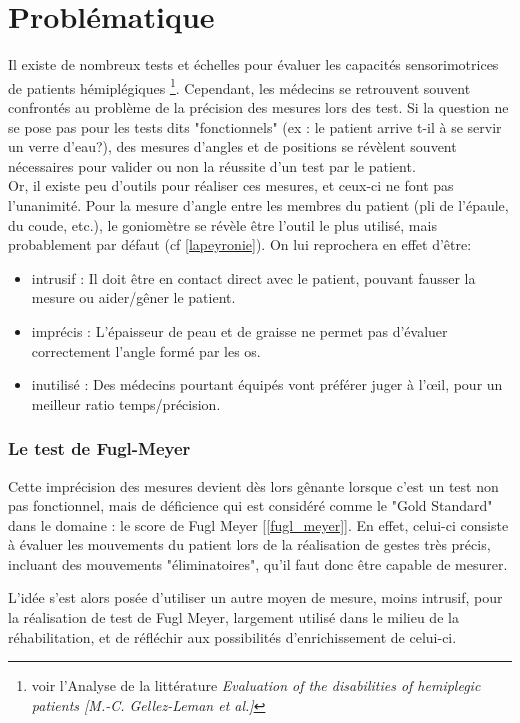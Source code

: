 \documentclass[french,12pt]{report}
\begin{document}
		\section{Problématique}
Il existe de nombreux tests et échelles pour évaluer les capacités sensorimotrices de patients hémiplégiques \footnote{voir l'Analyse de la littérature \textit{Evaluation of the disabilities of hemiplegic patients [M.-C. Gellez-Leman et al.]}}. Cependant, les médecins se retrouvent souvent confrontés au problème de la précision des mesures lors des test. Si la question ne se pose pas pour les tests dits "fonctionnels" (ex : le patient arrive t-il à se servir un verre d'eau?), des mesures d'angles et de positions se révèlent souvent nécessaires pour valider ou non la réussite d'un test par le patient.
\\Or, il existe peu d'outils pour réaliser ces mesures, et ceux-ci ne font pas l'unanimité. Pour la mesure d'angle entre les membres du patient (pli de l'épaule, du coude, etc.), le goniomètre se révèle être l'outil le plus utilisé, mais probablement par défaut (cf \ref{lapeyronie}). On lui reprochera en effet d'être: 
\begin{itemize}
	\item {intrusif :} Il doit être en contact direct avec le patient, pouvant fausser la mesure ou aider/gêner le patient.
	\item {imprécis :} L'épaisseur de peau et de graisse ne permet pas d'évaluer correctement l'angle formé par les os.
	\item {inutilisé :} Des médecins pourtant équipés vont préférer juger à l'œil, pour un meilleur ratio temps/précision.
\end{itemize}
		\subsubsection{Le test de Fugl-Meyer}
Cette imprécision des mesures devient dès lors gênante lorsque c'est un test non pas fonctionnel, mais de déficience qui est considéré comme le "Gold Standard" dans le domaine : le score de Fugl Meyer [\ref{fugl_meyer}]. En effet, celui-ci consiste à évaluer les mouvements du patient lors de la réalisation de gestes très précis, incluant des mouvements "éliminatoires", qu'il faut donc être capable de mesurer.	
	
	L'idée s'est alors posée d'utiliser un autre moyen de mesure, moins intrusif, pour la réalisation de test de Fugl Meyer, largement utilisé dans le milieu de la réhabilitation, et de réfléchir aux possibilités d'enrichissement de celui-ci.
\newpage
\end{document}

